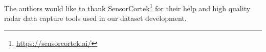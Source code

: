 \documentclass[10pt, conference, compsocconf]{IEEEtran}
\begin{document}
The authors would like to thank SensorCortek\footnote{\url{https://sensorcortek.ai/}} for their help and high quality radar data capture tools used in our dataset development.






%

%
%


\end{document}
